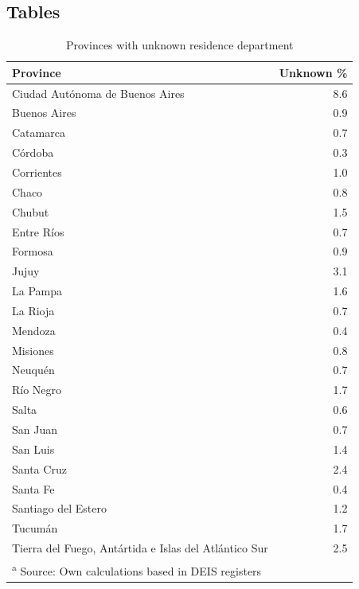 \documentclass[12pt,]{article}
\begin{document}
\hypertarget{tables}{%
\subsection{Tables}\label{tables}}

\begin{table}

\caption{\label{tab:SinDEP}Provinces with unknown residence department}
\centering
\begin{tabular}[t]{l|r}
\hline
Province & Unknown \%\\
\hline
Ciudad Autónoma de Buenos Aires & 8.6\\
\hline
Buenos Aires & 0.9\\
\hline
Catamarca & 0.7\\
\hline
Córdoba & 0.3\\
\hline
Corrientes & 1.0\\
\hline
Chaco & 0.8\\
\hline
Chubut & 1.5\\
\hline
Entre Ríos & 0.7\\
\hline
Formosa & 0.9\\
\hline
Jujuy & 3.1\\
\hline
La Pampa & 1.6\\
\hline
La Rioja & 0.7\\
\hline
Mendoza & 0.4\\
\hline
Misiones & 0.8\\
\hline
Neuquén & 0.7\\
\hline
Río Negro & 1.7\\
\hline
Salta & 0.6\\
\hline
San Juan & 0.7\\
\hline
San Luis & 1.4\\
\hline
Santa Cruz & 2.4\\
\hline
Santa Fe & 0.4\\
\hline
Santiago del Estero & 1.2\\
\hline
Tucumán & 1.7\\
\hline
Tierra del Fuego, Antártida e Islas del Atlántico Sur & 2.5\\
\hline
\multicolumn{2}{l}{\textsuperscript{a} Source: Own calculations based in DEIS registers}\\
\end{tabular}
\end{table}
\end{document}
